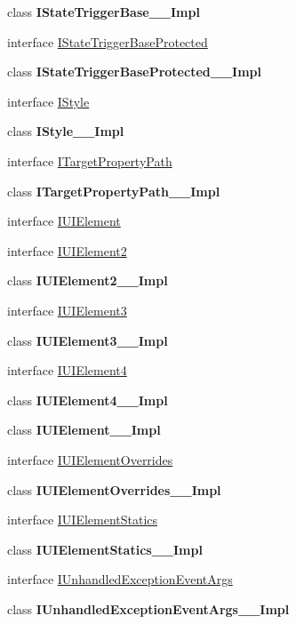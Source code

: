 \begin{DoxyCompactItemize}
class {\bfseries I\+State\+Trigger\+Base\+\_\+\+\_\+\+Impl}
\item 
interface \hyperlink{interface_windows_1_1_u_i_1_1_xaml_1_1_i_state_trigger_base_protected}{I\+State\+Trigger\+Base\+Protected}
\item 
class {\bfseries I\+State\+Trigger\+Base\+Protected\+\_\+\+\_\+\+Impl}
\item 
interface \hyperlink{interface_windows_1_1_u_i_1_1_xaml_1_1_i_style}{I\+Style}
\item 
class {\bfseries I\+Style\+\_\+\+\_\+\+Impl}
\item 
interface \hyperlink{interface_windows_1_1_u_i_1_1_xaml_1_1_i_target_property_path}{I\+Target\+Property\+Path}
\item 
class {\bfseries I\+Target\+Property\+Path\+\_\+\+\_\+\+Impl}
\item 
interface \hyperlink{interface_windows_1_1_u_i_1_1_xaml_1_1_i_u_i_element}{I\+U\+I\+Element}
\item 
interface \hyperlink{interface_windows_1_1_u_i_1_1_xaml_1_1_i_u_i_element2}{I\+U\+I\+Element2}
\item 
class {\bfseries I\+U\+I\+Element2\+\_\+\+\_\+\+Impl}
\item 
interface \hyperlink{interface_windows_1_1_u_i_1_1_xaml_1_1_i_u_i_element3}{I\+U\+I\+Element3}
\item 
class {\bfseries I\+U\+I\+Element3\+\_\+\+\_\+\+Impl}
\item 
interface \hyperlink{interface_windows_1_1_u_i_1_1_xaml_1_1_i_u_i_element4}{I\+U\+I\+Element4}
\item 
class {\bfseries I\+U\+I\+Element4\+\_\+\+\_\+\+Impl}
\item 
class {\bfseries I\+U\+I\+Element\+\_\+\+\_\+\+Impl}
\item 
interface \hyperlink{interface_windows_1_1_u_i_1_1_xaml_1_1_i_u_i_element_overrides}{I\+U\+I\+Element\+Overrides}
\item 
class {\bfseries I\+U\+I\+Element\+Overrides\+\_\+\+\_\+\+Impl}
\item 
interface \hyperlink{interface_windows_1_1_u_i_1_1_xaml_1_1_i_u_i_element_statics}{I\+U\+I\+Element\+Statics}
\item 
class {\bfseries I\+U\+I\+Element\+Statics\+\_\+\+\_\+\+Impl}
\item 
interface \hyperlink{interface_windows_1_1_u_i_1_1_xaml_1_1_i_unhandled_exception_event_args}{I\+Unhandled\+Exception\+Event\+Args}
\item 
class {\bfseries I\+Unhandled\+Exception\+Event\+Args\+\_\+\+\_\+\+Impl}

\end{DoxyCompactItemize}
